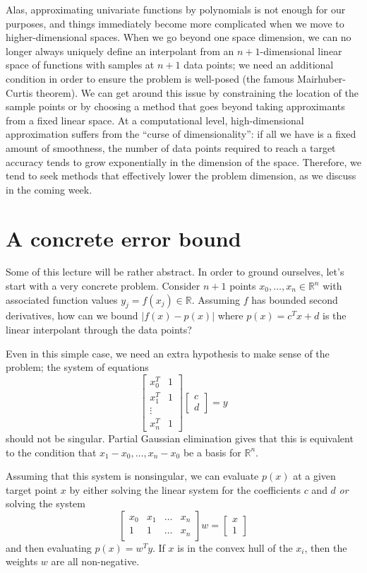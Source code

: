 \documentclass[12pt, leqno]{article} %
\begin{document}
Alas, approximating univariate functions by polynomials is not enough
for our purposes, and things immediately become more complicated when
we move to higher-dimensional spaces.  When we go beyond one space
dimension, we can no longer always uniquely define an interpolant
from an $n+1$-dimensional linear space of functions with samples at
$n+1$ data points; we need an additional condition in order to ensure
the problem is well-posed (the famous Mairhuber-Curtis theorem).  We
can get around this issue by constraining the location of the sample
points or by choosing a method that goes beyond taking approximants
from a fixed linear space.  At a computational level, high-dimensional
approximation suffers from the ``curse of dimensionality'': if all we
have is a fixed amount of smoothness, the number of data points
required to reach a target accuracy tends to grow exponentially in the
dimension of the space.  Therefore, we tend to seek methods that
effectively lower the problem dimension, as we discuss in the coming
week.

\section{A concrete error bound}

Some of this lecture will be rather abstract.  In order to ground
ourselves, let's start with a very concrete problem.  Consider $n+1$
points $x_0, \ldots, x_n \in \mathbb{R}^n$ with associated function
values $y_j = f(x_j) \in \mathbb{R}$.  Assuming $f$ has bounded second
derivatives, how can we bound $|f(x)-p(x)|$ where $p(x) = c^T x + d$
is the linear interpolant through the data points?

Even in this simple case, we need an extra hypothesis to make sense of
the problem; the system of equations
\[
  \begin{bmatrix}
    x_0^T & 1 \\
    x_1^T & 1 \\
    \vdots \\
    x_n^T & 1
  \end{bmatrix}
  \begin{bmatrix} c \\ d \end{bmatrix} = y
\]
should not be singular.  Partial Gaussian elimination gives that this
is equivalent to the condition that $x_1-x_0, \ldots, x_n-x_0$ be a
basis for $\mathbb{R}^n$.

Assuming that this system is nonsingular, we can evaluate $p(x)$ at a
given target point $x$ by either solving the linear system for the
coefficients $c$ and $d$ {\em or} solving the system
\[
  \begin{bmatrix}
    x_0 & x_1 & \ldots & x_n \\
    1 & 1 & \ldots & x_n
  \end{bmatrix}
  w =
  \begin{bmatrix} x \\ 1 \end{bmatrix}
\]
and then evaluating $p(x) = w^T y$.  If $x$ is in the convex hull of
the $x_i$, then the weights $w$ are all non-negative.
\end{document}
